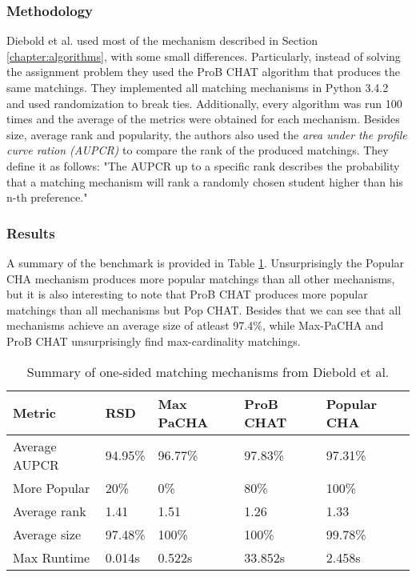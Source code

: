 \subsubsection{Methodology}
Diebold et al. used most of the mechanism described in Section \ref{chapter:algorithms}, with some small differences. Particularly, instead of solving the assignment problem they used the ProB CHAT algorithm that produces the same matchings. They implemented all matching mechanisms in Python 3.4.2 and used randomization to break ties. Additionally, every algorithm was run 100 times and the average of the metrics were obtained for each mechanism. 
Besides size, average rank and popularity, the authors also used the \emph{area under the profile curve ration (AUPCR)} to compare the rank of the produced matchings. They define it as follows: "The AUPCR up to a specific rank describes the probability that a matching mechanism will rank a randomly chosen student higher than his n-th preference."\cite{DieboldBenchmark}

\subsubsection{Results}
A summary of the benchmark is provided in Table \ref{tab:diebold-benchmark}. Unsurprisingly the Popular CHA mechanism produces more popular matchings than all other mechanisms, but it is also interesting to note that ProB CHAT produces more popular matchings than all mechanisms but Pop CHAT. Besides that we can see that all mechanisms achieve an average size of atleast 97.4\%, while Max-PaCHA and ProB CHAT unsurprisingly find max-cardinality matchings.

\begin{table}[h!]
    \centering 
    \begin{tabular}{|l|l|l|l|l|}
        \hline
        Metric & RSD & Max PaCHA & ProB CHAT & Popular CHA \\ \hline
        Average AUPCR & 94.95\% & 96.77\% & \cellcolor[HTML]{9AFF99}97.83\% & 97.31\% \\ \hline
        More Popular & 20\% & 0\% & 80\% & \cellcolor[HTML]{9AFF99}100\% \\ \hline
        Average rank & 1.41 & 1.51 & \cellcolor[HTML]{9AFF99}1.26 & 1.33 \\ \hline
        Average size & 97.48\% & \cellcolor[HTML]{9AFF99}100\% & \cellcolor[HTML]{9AFF99}100\% & 99.78\% \\ \hline
        Max Runtime & \cellcolor[HTML]{9AFF99}0.014s & 0.522s & \cellcolor[HTML]{FFCCC9}33.852s & 2.458s \\ \hline
        \end{tabular}
    \caption{Summary of one-sided matching mechanisms from Diebold et al. \cite{DieboldBenchmark}}
    \label{tab:diebold-benchmark}
\end{table}

